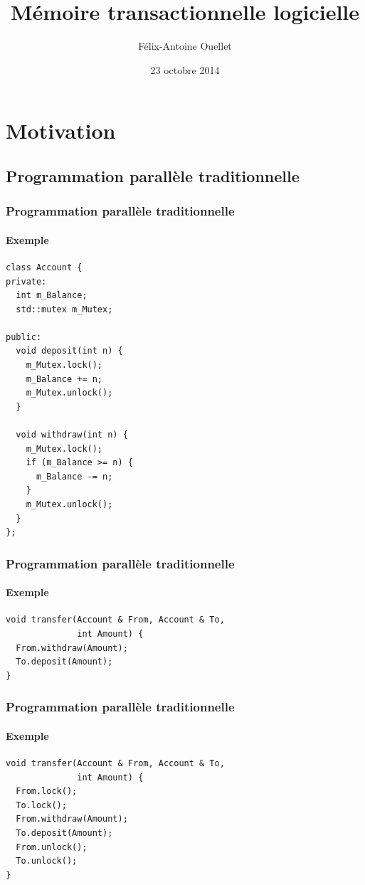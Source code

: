 \documentclass{beamer}
\author[Félix-Antoine Ouellet]{Félix-Antoine Ouellet}
\title[MTL\hspace{2em}\insertframenumber/\inserttotalframenumber]{Mémoire transactionnelle logicielle}
\institute{Université de Sherbrooke}
\date{23 octobre 2014}
\begin{document}
\begin{frame}
\titlepage %
\end{frame}

\begin{frame}
\tableofcontents[hideallsubsections]
\end{frame}

\section{Motivation}
\subsection{Programmation parallèle traditionnelle}

\newlength\someheight
\setlength\someheight{3.5cm}

\begin{frame}[fragile]
\frametitle{Programmation parallèle traditionnelle}
\framesubtitle{Exemple}
\begin{adjustbox}{width=\textwidth,height=\someheight,keepaspectratio}
\begin{lstlisting}
class Account {
private:
  int m_Balance;
  std::mutex m_Mutex;
  
public:
  void deposit(int n) {
    m_Mutex.lock();
    m_Balance += n;
    m_Mutex.unlock();
  }

  void withdraw(int n) {
    m_Mutex.lock();
    if (m_Balance >= n) {
      m_Balance -= n;
    }
    m_Mutex.unlock();
  }
};
\end{lstlisting}
\end{adjustbox}
\end{frame}

\begin{frame}[fragile]
\frametitle{Programmation parallèle traditionnelle}
\framesubtitle{Exemple}
\begin{lstlisting}
void transfer(Account & From, Account & To, 
              int Amount) {
  From.withdraw(Amount);
  To.deposit(Amount);
}
\end{lstlisting}
\end{frame}

\begin{frame}[fragile]
\frametitle{Programmation parallèle traditionnelle}
\framesubtitle{Exemple}
\begin{lstlisting}
void transfer(Account & From, Account & To, 
              int Amount) {
  From.lock();
  To.lock();
  From.withdraw(Amount);
  To.deposit(Amount);
  From.unlock();
  To.unlock();
}
\end{lstlisting}
\end{frame}
\end{document}

